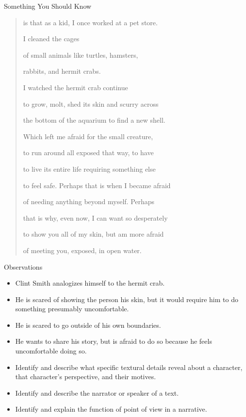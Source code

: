 \documentclass{scrreprt} %
\begin{document}
\begin{example}

Something You Should Know

\begin{quote}
	is that as a kid, I once worked at a pet store.
	
	I cleaned the cages
	
	of small animals like turtles, hamsters,
	
	rabbits, and hermit crabs. 
	
	I watched the hermit crab continue
	
	to grow, molt, shed its skin and scurry across
	
	the bottom of the aquarium to find a new shell.
	
	Which left me afraid for the small creature,
	
	to run around all exposed that way, to have
	
	to live its entire life requiring something else
	
	to feel safe. Perhaps that is when I became afraid
	
	of needing anything beyond myself. Perhaps
	
	that is why, even now, I can want so desperately
	
	to show you all of my skin, but am more afraid
	
	of meeting you, exposed, in open water.
\end{quote}

Observations

\begin{itemize}
	\item Clint Smith analogizes himself to the hermit crab.
	\item He is scared of showing the person his skin, but it would require him
	to do something presumably uncomfortable.
	\item He is scared to go outside of his own boundaries.
	\item He wants to share his story, but is afraid to do so because he feels
	uncomfortable doing so.
\end{itemize}
\end{example}

\begin{itemize}
	\item Identify and describe what specific textural details reveal about a
	character, that character's perspective, and their motives.
	\item Identify and describe the narrator or speaker of a text.
	\item Identify and explain the function of point of view in a narrative.
\end{itemize}
\end{document}
